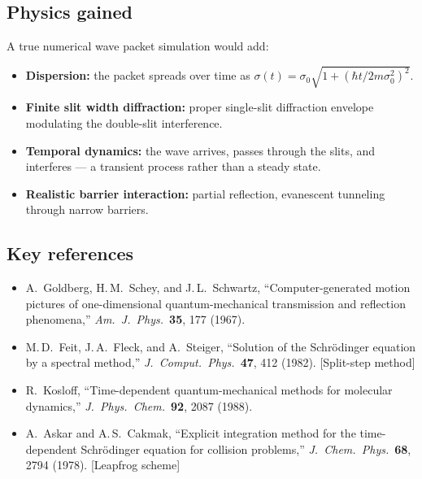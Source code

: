 \documentclass[11pt,a4paper]{article}
\begin{document}
\subsection{Physics gained}

A true numerical wave packet simulation would add:
\begin{itemize}
  \item \textbf{Dispersion:} the packet spreads over time as $\sigma(t) = \sigma_0\sqrt{1 + (\hbar t / 2m\sigma_0^2)^2}$.
  \item \textbf{Finite slit width diffraction:} proper single-slit diffraction envelope modulating the double-slit interference.
  \item \textbf{Temporal dynamics:} the wave arrives, passes through the slits, and interferes --- a transient process rather than a steady state.
  \item \textbf{Realistic barrier interaction:} partial reflection, evanescent tunneling through narrow barriers.
\end{itemize}

\subsection{Key references}

\begin{itemize}
  \item A.~Goldberg, H.\,M.~Schey, and J.\,L.~Schwartz, ``Computer-generated motion pictures of one-dimensional quantum-mechanical transmission and reflection phenomena,'' \emph{Am.\ J.\ Phys.}\ \textbf{35}, 177 (1967).
  \item M.\,D.~Feit, J.\,A.~Fleck, and A.~Steiger, ``Solution of the Schr\"odinger equation by a spectral method,'' \emph{J.\ Comput.\ Phys.}\ \textbf{47}, 412 (1982). [Split-step method]
  \item R.~Kosloff, ``Time-dependent quantum-mechanical methods for molecular dynamics,'' \emph{J.\ Phys.\ Chem.}\ \textbf{92}, 2087 (1988).
  \item A.~Askar and A.\,S.~Cakmak, ``Explicit integration method for the time-dependent Schr\"odinger equation for collision problems,'' \emph{J.\ Chem.\ Phys.}\ \textbf{68}, 2794 (1978). [Leapfrog scheme]
\end{itemize}
\end{document}
